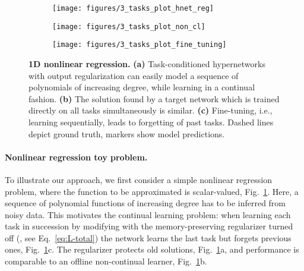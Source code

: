 \documentclass{article}
\begin{document}
\begin{figure}[htbp]
    \begin{subfigure}{0.32\linewidth}
    \caption{\vspace{-0.15cm}}
    \texttt{[image: figures/3\_tasks\_plot\_hnet\_reg]}
    \end{subfigure}
    \begin{subfigure}{0.32\linewidth}
    \caption{\vspace{-0.15cm}}
    \texttt{[image: figures/3\_tasks\_plot\_non\_cl]}
    \end{subfigure}
    \begin{subfigure}{0.32\linewidth}
    \caption{\vspace{-0.15cm}}
    \texttt{[image: figures/3\_tasks\_plot\_fine\_tuning]}
    \end{subfigure}
  \vspace{-0.3cm}
  \caption{\textbf{1D nonlinear regression.} \textbf{(a)} Task-conditioned hypernetworks with output regularization can easily model a sequence of polynomials of increasing degree, while learning in a continual fashion. \textbf{(b)} The solution found by a target network which is trained directly on all tasks simultaneously is similar. \textbf{(c)} Fine-tuning, i.e., learning sequentially, leads to forgetting of past tasks. Dashed lines depict ground truth, markers show model predictions. \label{fig:regression}}
\end{figure}

\vspace{-2mm}
\paragraph{Nonlinear regression toy problem.} To illustrate our approach, we first consider a simple nonlinear regression problem, where the function to be approximated is scalar-valued, Fig.~\ref{fig:regression}. Here, a sequence of polynomial functions of increasing degree has to be inferred from noisy data. This motivates the continual learning problem: when learning each task in succession by modifying  with the memory-preserving regularizer turned off (, see Eq.~\ref{eq:L-total}) the network learns the last task but forgets previous ones, Fig.~\ref{fig:regression}c. The regularizer protects old solutions, Fig.~\ref{fig:regression}a, and performance is comparable to an offline non-continual learner, Fig.~\ref{fig:regression}b.
\end{document}
